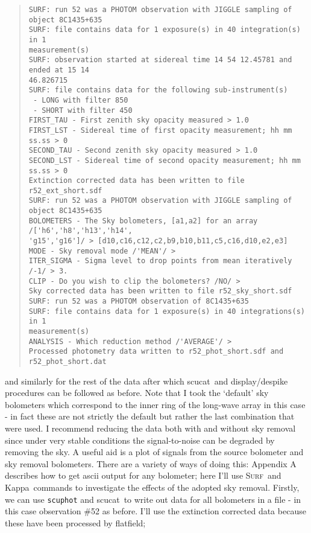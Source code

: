 \documentclass[twoside,11pt,fleqn]{article}
\newenvironment{myquote}{\begin{quote}\begin{small}}{\end{small}\end{quote}}
\newcommand{\Kappa}{\xref{{\sc Kappa}}{sun95}{}}
\newcommand{\surf}{\xref{\textsc{Surf}}{sun216}{}}
\newcommand{\task}[1]{{\sf #1}}
\newcommand{\flatf}{\xref{\task{flatfield}}{sun216}{FLATFIELD}}
\newcommand{\scucat}{\xref{\task{scucat}}{sun216}{SCUCAT}}
\newcommand{\xref}[3]{#1}
\begin{document}
\begin{myquote}
\begin{verbatim}
SURF: run 52 was a PHOTOM observation with JIGGLE sampling of object 8C1435+635
SURF: file contains data for 1 exposure(s) in 40 integration(s) in 1
measurement(s)
SURF: observation started at sidereal time 14 54 12.45781 and ended at 15 14
46.826715
SURF: file contains data for the following sub-instrument(s)
 - LONG with filter 850
 - SHORT with filter 450
FIRST_TAU - First zenith sky opacity measured > 1.0
FIRST_LST - Sidereal time of first opacity measurement; hh mm ss.ss > 0
SECOND_TAU - Second zenith sky opacity measured > 1.0
SECOND_LST - Sidereal time of second opacity measurement; hh mm ss.ss > 0
Extinction corrected data has been written to file r52_ext_short.sdf
SURF: run 52 was a PHOTOM observation with JIGGLE sampling of object 8C1435+635
BOLOMETERS - The Sky bolometers, [a1,a2] for an array /['h6','h8','h13','h14',
'g15','g16']/ > [d10,c16,c12,c2,b9,b10,b11,c5,c16,d10,e2,e3]
MODE - Sky removal mode /'MEAN'/ >
ITER_SIGMA - Sigma level to drop points from mean iteratively /-1/ > 3.
CLIP - Do you wish to clip the bolometers? /NO/ >
Sky corrected data has been written to file r52_sky_short.sdf
SURF: run 52 was a PHOTOM observation of 8C1435+635
SURF: file contains data for 1 exposure(s) in 40 integrations(s) in 1
measurement(s)
ANALYSIS - Which reduction method /'AVERAGE'/ >
Processed photometry data written to r52_phot_short.sdf and r52_phot_short.dat
\end{verbatim}
\end{myquote}

and similarly for the rest of the data after which \scucat\ and
display/despike procedures can be followed as before. Note that I took
the `default' sky bolometers which correspond to the inner ring of the
long-wave array in this case - in fact these are not strictly the
default but rather the last combination that were used. I recommend
reducing the data both with and without sky removal since under very
stable conditions the signal-to-noise can be degraded by removing the
sky.  A useful aid is a plot of signals from the source bolometer and
sky removal bolometers. There are a variety of ways of doing this:
Appendix A describes how to get ascii output for any bolometer; here
I'll use \surf\ and \Kappa\ commands to investigate the
effects of the adopted sky removal. Firstly, we can use {\tt scuphot}
and \scucat\ to write out data for all bolometers in a file - in
this case observation \#52 as before. I'll use the extinction
corrected data because these have been processed by \flatf;
\end{document}
